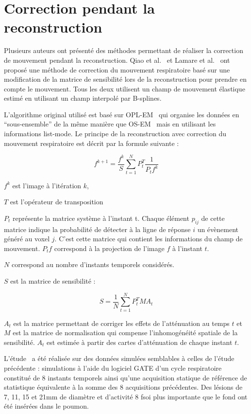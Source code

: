 \section{Correction pendant la reconstruction}
\label{lab:CorrpendantRecon}
Plusieurs auteurs ont présenté des méthodes permettant de réaliser la correction de mouvement pendant la reconstruction. Qiao et al.~\cite{qiao2006motion} et Lamare et al.~\cite{lamare2007list} ont proposé une méthode de correction du mouvement respiratoire basé sur une modification de la matrice de sensibilité lors de la reconstruction pour prendre en compte le mouvement. Tous les deux utilisent un champ de mouvement élastique estimé en utilisant un champ interpolé par B-splines.

L'algorithme original utilisé est basé sur OPL-EM~\cite{reader2002one} qui organise les données en ``sous-ensemble'' de la même manière que OS-EM~\cite{hudson1994accelerated} mais en utilisant les informations list-mode. Le principe de la reconstruction avec correction du mouvement respiratoire est décrit par la formule suivante :

\label{lab:corrMatSyst}
\begin{equation}
 f^{k+1}=\frac{f^k}{S} \sum_{t=1}^{N} P_t^T \frac{1}{P_t f^k} 
\end{equation}

$f^k$ est l'image à l'itération $k$,

$T$ est l'opérateur de transposition

$P_t$ représente la matrice système à l'instant t. Chaque élément $p_{ij}$ de cette matrice indique la probabilité de détecter à la ligne de réponse $i$ un évènement généré au voxel $j$. C'est cette matrice qui contient les informations du champ de mouvement. $P_t f$ correspond à la projection de l'image $f$ à l'instant $t$.  

$N$ correspond au nombre d'instants temporels considérés.

$S$ est la matrice de sensibilité :

\begin{equation}
 S=\frac{1}{N} \sum_{t=1}^{N} P_t^T M A_t 
\end{equation}

 $A_t$ est la matrice permettant de corriger les effets de l'atténuation au temps $t$ et $M$ est la matrice de normalisation qui compense l'inhomogénéité spatiale de la sensibilité. $A_t$ est estimée à partir des cartes d'atténuation de chaque instant $t$.

L'étude~\cite{lamare2007list} a été réalisée sur des données simulées semblables à celles de l'étude précédente : simulations à l'aide du logiciel GATE d'un cycle respiratoire constitué de 8 instants temporels ainsi qu'une acquisition statique de référence de statistique équivalente à la somme des 8 acquisitions précédentes. Des lésions de 7, 11, 15 et 21mm de diamètre et d'activité 8 fsoi plus importante que le fond ont été insérées dans le poumon.
 
